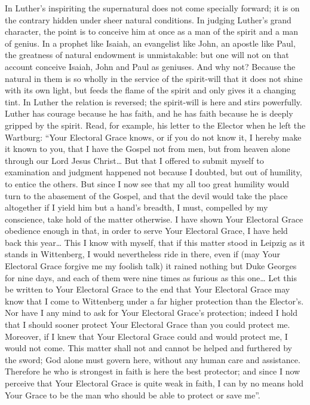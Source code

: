\documentclass[12pt,a4paper,openany]{book}
\newcommand{\opage}[1]{\marginnote{\footnotesize\textit{[#1]}}}
\begin{document}
In Luther's inspiriting the supernatural does not come
specially forward; it is on the contrary hidden under sheer natural conditions.
In judging Luther's grand
character, the point is to conceive him at once
as a man of the spirit and a man of genius. In a
prophet like Isaiah, an evangelist like John, an
apostle like Paul, the greatness of natural endowment is unmistakable:
but one will not on that account conceive Isaiah,
John and Paul as geniuses. And why not?
Because the natural in them is so wholly in the service of the spirit-will
that it does not shine with its own light,
but feeds the flame of the spirit and only gives it a
changing tint. In Luther the relation is reversed;
the spirit-will is here and stirs powerfully. Luther has
courage because he has faith, and he has faith because he
is deeply gripped by the spirit. Read, for example, his letter
to the Elector when he left the Wartburg: ``Your Electoral
Grace knows, or if you do not know it, I hereby make it
known to you, that I have the Gospel not from
men, but from heaven alone through our Lord Jesus
Christ\dots{} But that I offered to submit
myself to examination and judgment happened not because I
doubted, but out of humility, to entice the others.
But since I now see that my all too great humility would
turn to the abasement of the Gospel, and that the devil would
\setcounter{footnote}{0}%
\opage{74}take the place altogether if I yield him
but a hand's breadth, I must, compelled by my conscience,
take hold of the matter otherwise. I have shown Your Electoral
Grace obedience enough in that, in order to serve
Your Electoral Grace, I have held back this year\dots{}
This I know with myself, that if this matter stood
in Leipzig as it stands in Wittenberg, I would
nevertheless ride in there, even if (may Your Electoral Grace
forgive me my foolish talk) it rained nothing but
Duke Georges for nine days, and each of them were nine times as
furious as this one\dots{} Let this be written to Your Electoral
Grace to the end that Your Electoral Grace may know
that I come to Wittenberg under a far higher
protection than the Elector's. Nor have I any
mind to ask for Your Electoral Grace's protection; indeed I
hold that I should sooner protect Your Electoral
Grace than you could protect me. Moreover,
if I knew that Your Electoral Grace could and would
protect me, I would not come. This matter
shall not and cannot be helped and furthered by the sword;
God alone must govern here, without any human care
and assistance. Therefore he who is strongest in faith
is here the best protector; and since I now perceive that Your Electoral
Grace is quite weak in faith, I can by no means
hold Your Grace to be the man who should be able to protect
or save me''.
\end{document}
